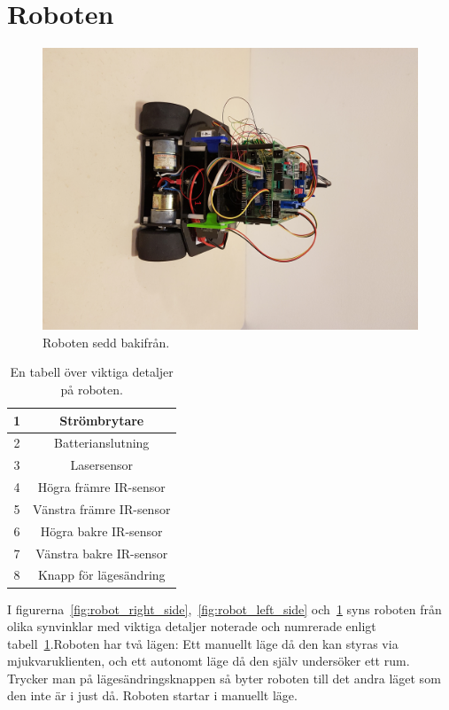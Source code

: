\documentclass{article}
\begin{document}
\section{Roboten}
\begin{figure}[H]
\centering
\includegraphics[scale=0.1]{robot_back}
\caption{Roboten sedd bakifrån.}
\label{fig:robot_back}
\end{figure}


\begin{table}[H]
\centering
\caption{En tabell över viktiga detaljer på roboten.}
\begin{tabular}{ | c | c | }
\hline
1 & Strömbrytare \\
\hline
2 & Batterianslutning \\
\hline
3 & Lasersensor \\
\hline
4 & Högra främre IR-sensor \\
\hline
5 & Vänstra främre IR-sensor \\
\hline
6 & Högra bakre IR-sensor \\
\hline
7 & Vänstra bakre IR-sensor \\
\hline
8 & Knapp för lägesändring \\
\hline
\end{tabular}
\label{table:components}
\end{table}


I figurerna~\ref{fig:robot_right_side},~\ref{fig:robot_left_side} och~\ref{fig:robot_back} syns roboten från olika synvinklar med viktiga detaljer noterade och numrerade enligt tabell~\ref{table:components}.Roboten har två lägen: Ett manuellt läge då den kan styras via mjukvaruklienten, och ett autonomt läge då den själv undersöker ett rum. Trycker man på lägesändringsknappen så byter roboten till det andra läget som den inte är i just då. Roboten startar i manuellt läge. \newline\newline
\end{document}
